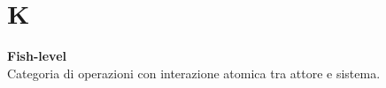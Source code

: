 \section{K}
\textbf{Fish-level}\\
Categoria di operazioni con interazione atomica tra attore e sistema.

\clearpage